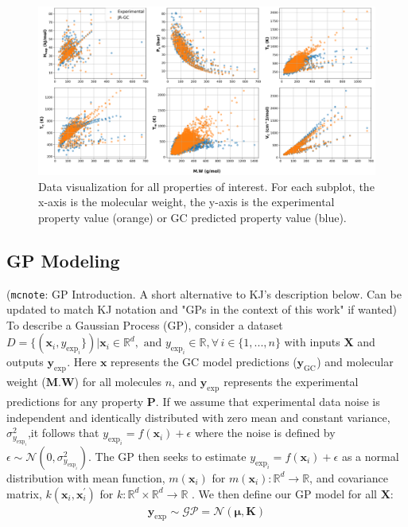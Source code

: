 \documentclass[journal=jacsat,manuscript=article]{achemso}
\newcommand{\xvec}{\ensuremath{\mathbf{x}}}
\newcommand{\mcnote}[1]{{\color{Plum} (\texttt{mcnote}: #1)}}
\newcommand{\Ygcvec}[1][]{\ensuremath{\mathbf{y}_{\text{GC}_{#1}}}}
\newcommand{\yexpvec}[1][]{\ensuremath{\mathbf{y}_{\text{exp}_{#1}}}}
\newcommand{\yexp}[1][]{\ensuremath{y_{\text{exp}_{#1}}}}
\begin{document}
\begin{figure}[H] %
    \centering
    \includegraphics[width=\textwidth]{"./MW_vs_Prop.png"} %
    \caption{Data visualization for all properties of interest. For each subplot, the x-axis is the molecular weight, the y-axis is the experimental property value (orange) or GC predicted property value (blue).}
    \label{fig:Data_Vis_Prop}
\end{figure}

\subsection{GP Modeling}
\mcnote{GP Introduction. A short alternative to KJ's description below. Can be updated to match KJ notation and "GPs in the context of this work" if wanted}
To describe a Gaussian Process (GP), consider a dataset $D = \{(\xvec_i, \yexp[i]\}) \vert \xvec_i \in \mathbb{R}^d, \text{ and } \yexp[i] \in \mathbb{R}, \forall \, i \in \{1,. . ., n\}$ with inputs $\mathbf{X}$ and outputs $\yexpvec[]$. Here $\xvec$ represents the GC model predictions ($\Ygcvec$) and molecular weight ($\textbf{M.W}$) for all molecules $n$, and $\yexpvec$ represents the experimental predictions for any property \textbf{P}. If we assume that experimental data noise is independent and identically distributed with zero mean and constant variance, $\sigma_{\yexp[i]}^2$,it follows that $\yexp[i] = f(\xvec_i) + \epsilon$ where the noise is defined by $\epsilon \sim \mathcal{N}(0,\sigma_{\yexp[i]}^2)$. The GP then seeks to estimate $\yexp[i] = f(\xvec_i) + \epsilon$ as a normal distribution with mean function, $m(\xvec_i)$ for $m(\xvec_i): \mathbb{R}^d \rightarrow \mathbb{R}$, and covariance matrix, $k(\xvec_i, \xvec_i^{\prime})$ for $k: \mathbb{R}^d \times \mathbb{R}^d \rightarrow \mathbb{R}$ \cite{Frazier2018AOptimization}. We then define our GP model for all $\mathbf{X}$:
\begin{gather*}
     \yexpvec \sim \mathcal{GP} = \mathcal{N}(\boldsymbol{\mu}, \mathbf{K})
\end{gather*}
\end{document}
